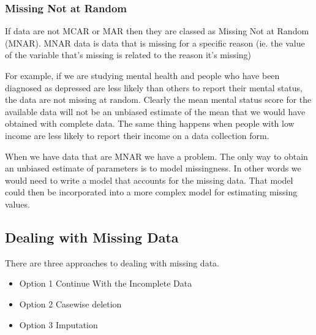 \documentclass[12pt]{article} %
\begin{document}
%


\subsubsection{Missing Not at Random}

If data are not MCAR or MAR then they are classed as Missing Not at Random (MNAR). 
MNAR data is data that is missing for a specific reason (ie. the value of the variable that's missing is related to the reason it's missing)

For example, if we are studying mental health and people who have been diagnosed as depressed are less likely than others to report their mental status, the data are not missing at random. Clearly the mean mental status score for the available data will not be an unbiased estimate of the mean that we would have obtained with complete data. The same thing happens when people with low income are less likely to report their income on a data collection form.

When we have data that are MNAR we have a problem. The only way to obtain an unbiased estimate of parameters is to model missingness. In other words we would need to write a model that accounts for the missing data. That model could then be incorporated into a more complex model for estimating missing values. 

\newpage
\subsection{Dealing with Missing Data}
There are three approaches to dealing with missing data.
\begin{itemize}
\item Option 1 Continue With the Incomplete Data
\item Option 2 Casewise deletion
\item Option 3 Imputation
\end{itemize}
\end{document}

